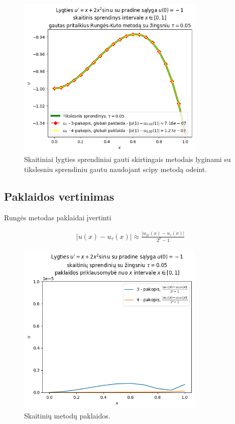 \documentclass[11pt]{article}
\begin{document}
\begin{figure}[h!]
    \centering
    \includegraphics[width=0.8\textwidth]{b1.png}
    \caption{Skaitiniai lygties sprendiniai gauti skirtingais metodais lyginami su tikslesniu sprendiniu gautu naudojant scipy metodą odeint.}
    \label{fig:pvz2}
\end{figure}

\newpage
\subsection{Paklaidos vertinimas}

Rungės metodas paklaidai įvertinti

\begin{align}
\vert u(x)-u_{\tau}(x)\vert\approx\frac{\vert u_{2\tau}(x) - u_{\tau}(x)\vert}{2^p - 1}
\end{align}

\begin{figure}[h!]
    \centering
    \includegraphics[width=0.8\textwidth]{error.png}
    \caption{Skaitinių metodų paklaidos.}
    \label{fig:pvz3}
\end{figure}
\end{document}
